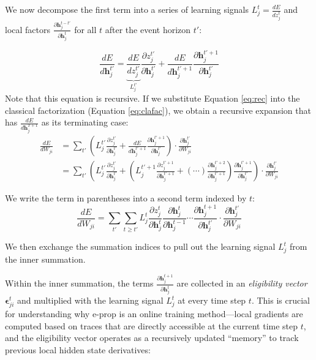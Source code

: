         We now decompose the first term into a series of learning signals $L_j^t = \frac{dE}{dz_j^t}$ and local factors $\frac{\partial\mathbf{h}_j^{t-t'}}{\partial\mathbf{h}_j^t}$ for all $t$ after the event horizon $t'$:

        \begin{equation}\label{eq:rec}
        \frac{dE}{d\mathbf{h}_j^{t'}} = \underbrace{\frac{dE}{dz_j^{t'}}}_{L^{t'}_j} \frac{\partial z_j^{t'}}{\partial\mathbf{h}_j^{t'}} + \frac{dE}{d\mathbf{h}_j^{t'+1}}\frac{\partial\mathbf{h}_j^{t'+1}}{\partial\mathbf{h}_j^{t'}}
        \end{equation}
        Note that this equation is recursive.
        If we substitute Equation \ref{eq:rec} into the classical factorization (Equation \ref{eq:clafac}), we obtain a recursive expansion that has $\frac{dE}{d\mathbf{h}^{T+1}_j}$ as its terminating case:
        \begin{align}
        \frac{dE}{dW_{ji}} &= \sum_{t'}\left(L_j^{t'}\frac{\partial z_j^{t'}}{\partial\mathbf{h}_j^{t'}} + \frac{dE}{d\mathbf{h}_j^{t'+1}}\frac{\partial\mathbf{h}_j^{t'+1}}{\partial\mathbf{h}_j^{t'}}\right)\cdot\frac{\partial\mathbf{h}_j^{t'}}{\partial W_{ji}}\\
        &= \sum_{t'}\left(L_j^{t'}\frac{\partial z_j^{t'}}{\partial\mathbf{h}_j^{t'}} + \left( L^{t'+1}_j \frac{\partial z_j^{t'+1}}{\partial\mathbf{h}_j^{t'+1}} + (\cdots)\frac{\partial\mathbf{h}_j^{t'+2}}{\partial\mathbf{h}_j^{t'+1}}  \right) \frac{\partial\mathbf{h}_j^{t'+1}}{\partial\mathbf{h}_j^{t'}}\right)\cdot\frac{\partial\mathbf{h}_j^{t'}}{\partial W_{ji}}
        \end{align}

        We write the term in parentheses into a second term indexed by $t$:
        \begin{equation}
        \frac{dE}{dW_{ji}} = \sum_{t'}\sum_{t\geq t'}L^t_j\frac{\partial z_j^t}{\partial\mathbf{h}_j^t}\frac{\partial\mathbf{h}^t_j}{\partial\mathbf{h}_j^{t-1}} \cdots \frac{\partial\mathbf{h}_j^{t+1}}{\partial\mathbf{h}_j^{t'}}\cdot\frac{\partial\mathbf{h}_j^{t'}}{\partial W_{ji}}
        \end{equation}

        We then exchange the summation indices to pull out the learning signal $L_j^t$ from the inner summation.

        Within the inner summation, the terms $\frac{\partial\mathbf{h}_j^{t+1}}{\partial\mathbf{h}_j^t}$ are collected in an \emph{eligibility vector} $\mathbf{\epsilon}^t_{ji}$ and multiplied with the learning signal $L^t_j$ at every time step $t$.
        This is crucial for understanding why e-prop is an online training method---local gradients are computed based on traces that are directly accessible at the current time step $t$, and the eligibility vector operates as a recursively updated ``memory'' to track previous local hidden state derivatives:

